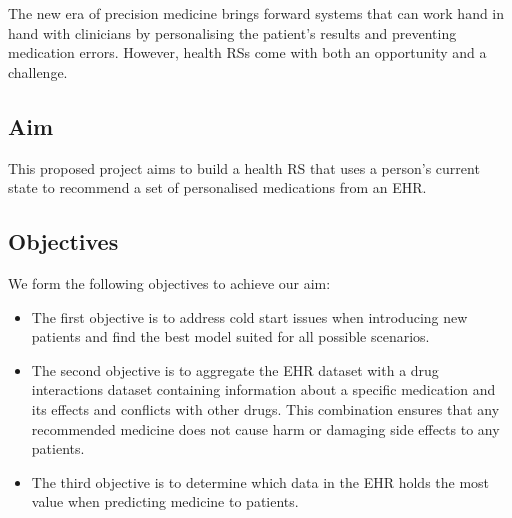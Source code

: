 The new era of precision medicine brings forward systems
that can work hand in hand with clinicians by
personalising the patient's results and preventing
medication errors. However, health RSs come with both an
opportunity and a challenge.

\subsection{Aim}
This proposed project aims to build a health RS that
uses a person's current state to recommend a set of
personalised medications from an EHR.

\subsection{Objectives}
We form the following objectives to achieve our aim:

\begin{itemize}

    \item 
         The first objective is to address cold start
         issues when introducing new patients and find
         the best model suited for all possible
         scenarios.

    \item 
        The second objective is to aggregate the EHR
        dataset with a drug interactions dataset
        containing information about a specific
        medication and its effects and conflicts with
        other drugs. This combination ensures that any
        recommended medicine does not cause harm or
        damaging side effects to any patients.

    \item 
        The third objective is to determine which data
        in the EHR holds the most value when predicting
        medicine to patients.

\end{itemize}
